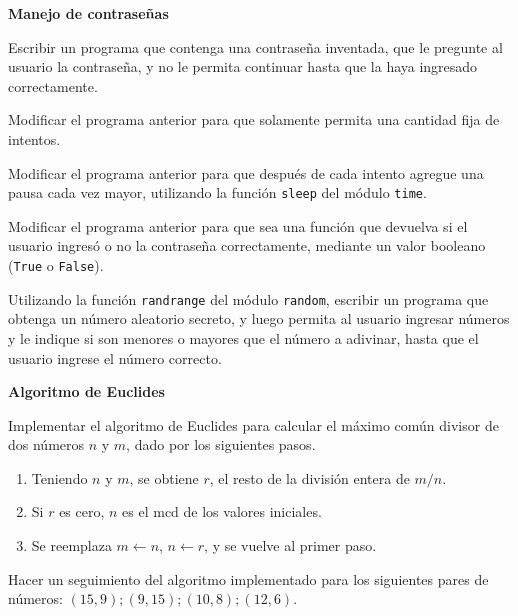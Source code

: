 \begin{ejercicio}
{\bf Manejo de contraseñas}
\begin{partes}
    \item Escribir un programa que contenga una contraseña inventada, que le
pregunte al usuario la contraseña, y no le permita continuar hasta que la
haya ingresado correctamente.
    \item Modificar el programa anterior para que solamente permita una
cantidad fija de intentos.
    \item Modificar el programa anterior para que después de cada intento
agregue una pausa cada vez mayor, utilizando la función \verb!sleep! del
módulo \verb!time!.
    \item Modificar el programa anterior para que sea una función que devuelva
si el usuario ingresó o no la contraseña correctamente, mediante un valor
booleano (\verb!True! o \verb!False!).
\end{partes}
\end{ejercicio}


\begin{ejercicio}
Utilizando la función \verb!randrange! del módulo \verb!random!,
escribir un programa que obtenga un número aleatorio secreto, y luego
permita al usuario ingresar números y le indique si son menores o mayores
que el número a adivinar, hasta que el usuario ingrese el número correcto.
\end{ejercicio}


\begin{ejercicio}
{\bf Algoritmo de Euclides}
\begin{partes}
    \item Implementar el algoritmo de Euclides para calcular el máximo
común divisor de dos números $n$ y $m$, dado por los siguientes pasos.
    \begin{enumerate}
        \item Teniendo $n$ y $m$, se obtiene $r$, el resto de la
división entera de $m/n$.
        \item Si $r$ es cero, $n$ es el mcd de los valores iniciales.
        \item Se reemplaza $m \leftarrow n$, $n \leftarrow r$, y se vuelve al
primer paso.
    \end{enumerate}
    \item Hacer un seguimiento del algoritmo implementado para los siguientes
pares de números: $(15,9); (9,15); (10,8); (12,6)$.
\end{partes}
\end{ejercicio}

